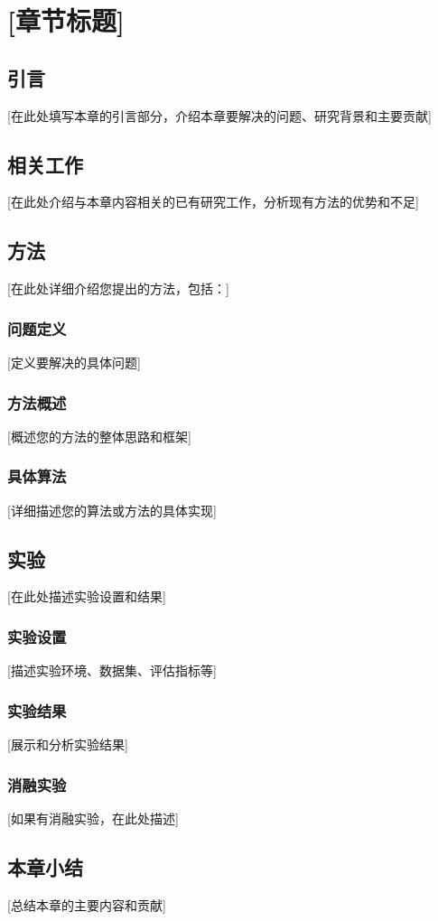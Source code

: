 \chapter{[章节标题]}

\section{引言}

[在此处填写本章的引言部分，介绍本章要解决的问题、研究背景和主要贡献]
\cite{示例数据集2023}

\section{相关工作}

[在此处介绍与本章内容相关的已有研究工作，分析现有方法的优势和不足]

\section{方法}

[在此处详细介绍您提出的方法，包括：]

\subsection{问题定义}

[定义要解决的具体问题]

\subsection{方法概述}

[概述您的方法的整体思路和框架]

\subsection{具体算法}

[详细描述您的算法或方法的具体实现]

\section{实验}

[在此处描述实验设置和结果]

\subsection{实验设置}

[描述实验环境、数据集、评估指标等]

\subsection{实验结果}

[展示和分析实验结果]

\subsection{消融实验}

[如果有消融实验，在此处描述]

\section{本章小结}

[总结本章的主要内容和贡献]
